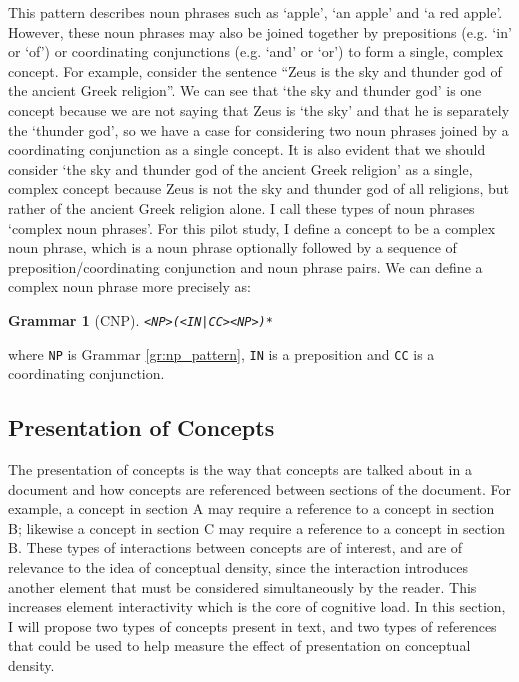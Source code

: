 \documentclass[12pt]{article}
\theoremstyle{grammarstyle}
\newtheorem{gram}{Grammar}
\begin{document}
This pattern describes noun phrases such as `apple', `an apple' and `a red apple'. However, these noun phrases may also be joined together by prepositions (e.g. `in' or `of') or coordinating conjunctions (e.g. `and' or `or') to form a single, complex concept. For example, consider the sentence ``Zeus is the sky and thunder god of the ancient Greek religion''. We can see that `the sky and thunder god' is one concept because we are not saying that Zeus is `the sky' and that he is separately the `thunder god', so we have a case for considering two noun phrases joined by a coordinating conjunction as a single concept. It is also evident that we should consider `the sky and thunder god of the ancient Greek religion' as a single, complex concept because Zeus is not the sky and thunder god of all religions, but rather of the ancient Greek religion alone.
I call these types of noun phrases `complex noun phrases'. For this pilot study, I define a concept to be a complex noun phrase, which is a noun phrase optionally followed by a sequence of preposition/coordinating conjunction and noun phrase pairs. We can define a complex noun phrase more precisely as:
\begin{gram}[CNP] \label{gr:cnp_pattern}
    \texttt{<NP>(<IN|CC><NP>)*}
\end{gram}
\noindent
where \texttt{NP} is Grammar \ref{gr:np_pattern}, \texttt{IN} is a preposition and \texttt{CC} is a coordinating conjunction.

\subsection{Presentation of Concepts} \label{sec:presentation of concepts}
The presentation of concepts is the way that concepts are talked about in a document and how concepts are referenced between sections of the document. For example, a concept in section A may require a reference to a concept in section B; likewise a concept in section C may require a reference to a concept in section B. These types of interactions between concepts are of interest, and are of relevance to the idea of conceptual density, since the interaction introduces another element that must be considered simultaneously by the reader.
This increases element interactivity which is the core of cognitive load.
In this section, I will propose two types of concepts present in text, and two types of references that could be used to help measure the effect of presentation on conceptual density.
\end{document}
